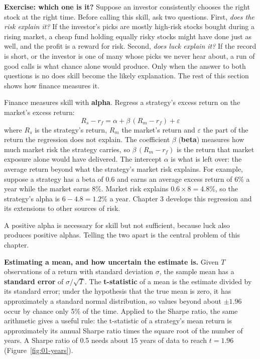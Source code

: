 \noindent\textbf{Exercise: which one is it?} Suppose an investor
consistently chooses the right stock at the right time. Before calling this
skill, ask two questions. First, \emph{does the risk explain it?} If the
investor's picks are mostly high-risk stocks bought during a rising market,
a cheap fund holding equally risky stocks might have done just as well, and
the profit is a reward for risk. Second, \emph{does luck explain it?} If the
record is short, or the investor is one of many whose picks we never hear
about, a run of good calls is what chance alone would produce. Only when the
answer to both questions is no does skill become the likely explanation. The
rest of this section shows how finance measures it.

Finance measures skill with \textbf{alpha}. Regress a strategy's excess return on the market's excess return:
\begin{equation}
  R_s - r_f = \alpha + \beta\,(R_m - r_f) + \varepsilon \nonumber
\end{equation}
where $R_s$ is the strategy's return, $R_m$ the market's return and $\varepsilon$ the part of the return the regression does not explain. The coefficient $\beta$ (\textbf{beta}) measures how much market risk the strategy carries, so $\beta\,(R_m - r_f)$ is the return that market exposure alone would have delivered. The intercept $\alpha$ is what is left over: the average return beyond what the strategy's market risk explains. For example, suppose a strategy has a beta of 0.6 and earns an average excess return of 6\% a year while the market earns 8\%. Market risk explains $0.6 \times 8 = 4.8$\%, so the strategy's alpha is $6 - 4.8 = 1.2$\% a year. Chapter 3 develops this regression and its extensions to other sources of risk.

A positive alpha is necessary for skill but not sufficient, because luck also produces positive alphas. Telling the two apart is the central problem of this chapter.

\textbf{Estimating a mean, and how uncertain the estimate is.} Given $T$ observations of a return with standard deviation $\sigma$, the sample mean has a \textbf{standard error} of $\sigma/\sqrt{T}$. The \textbf{t-statistic} of a mean is the estimate divided by its standard error; under the hypothesis that the true mean is zero, it has approximately a standard normal distribution, so values beyond about $\pm 1.96$ occur by chance only 5\% of the time. Applied to the Sharpe ratio, the same arithmetic gives a useful rule: the t-statistic of a strategy's mean return is approximately its annual Sharpe ratio times the square root of the number of years. A Sharpe ratio of 0.5 
needs about 15 years of data to reach $t = 1.96$ (Figure~\ref{fig:01-years}).

